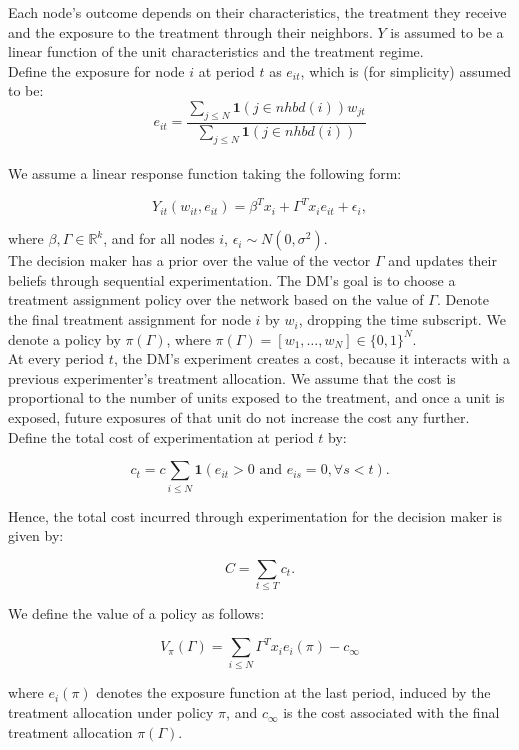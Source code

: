\documentclass[12pt,a4paper]{article}
\begin{document}
Each node's outcome depends on their characteristics, the treatment they receive and the exposure to the treatment through their neighbors. $Y$ is assumed to be a linear function of the unit characteristics and the treatment regime. \\

Define the exposure for node $i$ at period $t$ as $e_{it}$, which is (for simplicity) assumed to be: 
$$e_{it} = \frac { \sum_{j \leq N}  \mathbf{1}(j \in nhbd(i)) w_{jt}}{ \sum_{j \leq N} \mathbf{1}(j \in nhbd(i)) }$$\\

We assume a linear response function taking the following form:

$$Y_{it}( w_{it}, e_{it}) = \beta^T x_i + \Gamma^T x_i e_{it} + \epsilon_i,$$

where $\beta, \Gamma \in \mathbb{R}^k$, and for all nodes $i$, $\epsilon_i \sim N(0, \sigma^2)$.\\

The decision maker has a prior over the value of the vector $\Gamma$ and updates their beliefs through sequential experimentation. The DM's goal is to choose a treatment assignment policy over the network based on the value of $\Gamma$. Denote the final treatment assignment for node $i$ by $w_i$, dropping the time subscript. We denote a policy by $\pi(\Gamma)$, where $\pi(\Gamma)=[w_1, \dots , w_N] \in \{0,1\}^N$.\\

At every period $t$, the DM's experiment creates a cost, because it interacts with a previous experimenter's treatment allocation. We assume that the cost is proportional to the number of units exposed to the treatment, and once a unit is exposed, future exposures of that unit do not increase the cost any further. Define the total cost of experimentation at period $t$ by:

$$c_t = c \sum_{i \leq N} \mathbf{1}\left( e_{it} > 0 \mbox{ and } e_{is}=0,  \forall s<t \right) .$$

Hence, the total cost incurred through experimentation for the decision maker is given by:

$$ C= \sum_{t \leq T} c_t  .$$

We define the value of a policy as follows:

$$V_\pi(\Gamma)=\sum_{i \leq N} \Gamma^T x_i e_i(\pi) - c_\infty$$

where $e_i(\pi)$ denotes the exposure function at the last period, induced by the treatment allocation under policy $\pi$, and $c_\infty$ is the cost associated with the final treatment allocation $\pi(\Gamma)$. \\
\end{document}
